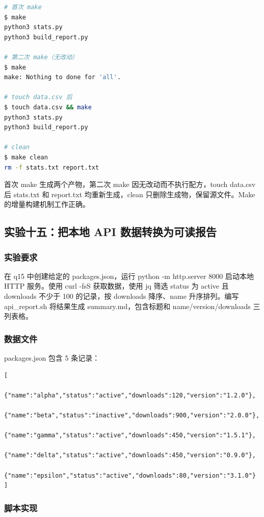 \documentclass[UTF8]{ctexart}
\begin{document}
\begin{lstlisting}[language=bash]
# 首次 make
$ make
python3 stats.py
python3 build_report.py

# 第二次 make（无改动）
$ make
make: Nothing to done for 'all'.

# touch data.csv 后
$ touch data.csv && make
python3 stats.py
python3 build_report.py

# clean
$ make clean
rm -f stats.txt report.txt
\end{lstlisting}

首次 make 生成两个产物，第二次 make 因无改动而不执行配方，touch data.csv 后 stats.txt 和 report.txt 均重新生成，clean 只删除生成物，保留源文件。Make 的增量构建机制工作正确。

\subsection{实验十五：把本地 API 数据转换为可读报告}

\subsubsection{实验要求}

在 q15 中创建给定的 packages.json，运行 python -m http.server 8000 启动本地 HTTP 服务。使用 curl -fsS 获取数据，使用 jq 筛选 status 为 active 且 downloads 不少于 100 的记录，按 downloads 降序、name 升序排列。编写 api\_report.sh 将结果生成 summary.md，包含标题和 name/version/downloads 三列表格。

\subsubsection{数据文件}

packages.json 包含 5 条记录：

\begin{lstlisting}
[
  {"name":"alpha","status":"active","downloads":120,"version":"1.2.0"},
  {"name":"beta","status":"inactive","downloads":900,"version":"2.0.0"},
  {"name":"gamma","status":"active","downloads":450,"version":"1.5.1"},
  {"name":"delta","status":"active","downloads":450,"version":"0.9.0"},
  {"name":"epsilon","status":"active","downloads":80,"version":"3.1.0"}
]
\end{lstlisting}

\subsubsection{脚本实现}
\end{document}
